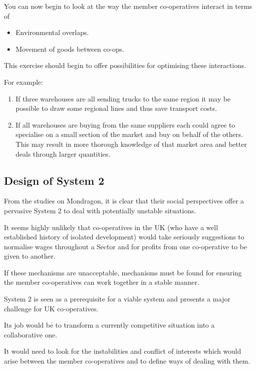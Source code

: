 You can now begin to look at the way the member co-operatives interact in terms of

\begin{itemize}
  \item Environmental overlaps.

  \item Movement of goods between co-ops.

\end{itemize}

This exercise should begin to offer possibilities for optimising these interactions.

For example:

\begin{enumerate}
  \item If three warehouses are all sending trucks to the same region it may be possible to draw some regional lines and thus save transport costs.

  \item If all warehouses are buying from the same suppliers each could agree to specialise on a small section of the market and buy on behalf of the others. This may result in more thorough knowledge of that market area and better deals through larger quantities.

\end{enumerate}

\subsection*{Design of System 2}
From the studies on Mondragon, it is clear that their social perspectives offer a pervasive System 2 to deal with potentially unstable situations.

It seems highly unlikely that co-operatives in the UK (who have a well established history of isolated development) would take seriously suggestions to normalise wages throughout a Sector and for profits from one co-operative to be given to another.

If these mechanisms are unacceptable, mechanisms must be found for ensuring the member co-operatives can work together in a stable manner.

System 2 is seen as a prerequisite for a viable system and presents a major challenge for UK co-operatives.

Its job would be to transform a currently competitive situation into a collaborative one.

It would need to look for the instabilities and conflict of interests which would arise between the member co-operatives and to define ways of dealing with them.

